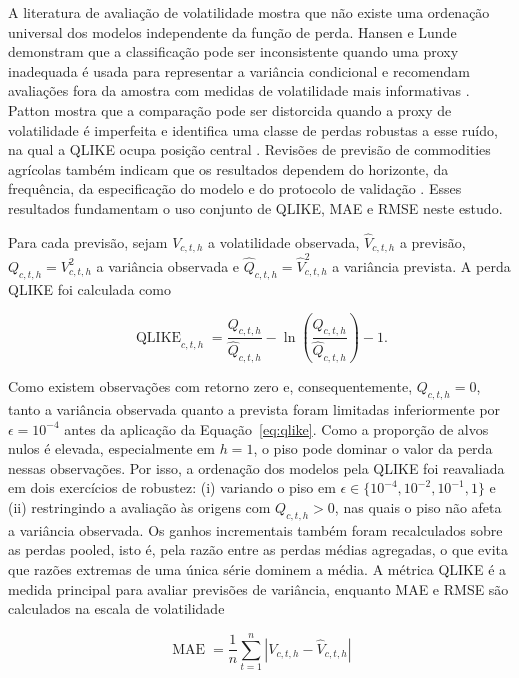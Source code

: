 \documentclass[a4paper,fleqn]{cas-sc}
\begin{document}
A literatura de avaliação de volatilidade mostra que não existe uma ordenação universal dos modelos independente da função de perda. Hansen e Lunde demonstram que a classificação pode ser inconsistente quando uma proxy inadequada é usada para representar a variância condicional e recomendam avaliações fora da amostra com medidas de volatilidade mais informativas \citep{HansenLunde2006ConsistentRanking}. Patton mostra que a comparação pode ser distorcida quando a proxy de volatilidade é imperfeita e identifica uma classe de perdas robustas a esse ruído, na qual a QLIKE ocupa posição central \citep{Patton2011VolatilityProxy}. Revisões de previsão de commodities agrícolas também indicam que os resultados dependem do horizonte, da frequência, da especificação do modelo e do protocolo de validação \citep{Guindani2024AgriculturalForecasting}. Esses resultados fundamentam o uso conjunto de QLIKE, MAE e RMSE neste estudo.

Para cada previsão, sejam \(V_{c,t,h}\) a volatilidade observada, \(\widehat{V}_{c,t,h}\) a previsão, \(Q_{c,t,h}=V_{c,t,h}^{2}\) a variância observada e \(\widehat{Q}_{c,t,h}=\widehat{V}_{c,t,h}^{2}\) a variância prevista. A perda QLIKE foi calculada como

\begin{equation}
\operatorname{QLIKE}_{c,t,h}
=
\frac{Q_{c,t,h}}{\widehat{Q}_{c,t,h}}
-\ln\left(\frac{Q_{c,t,h}}{\widehat{Q}_{c,t,h}}\right)-1.
\label{eq:qlike}
\end{equation}

Como existem observações com retorno zero e, consequentemente, \(Q_{c,t,h}=0\), tanto a variância observada quanto a prevista foram limitadas inferiormente por \(\epsilon=10^{-4}\) antes da aplicação da Equação~\ref{eq:qlike}. Como a proporção de alvos nulos é elevada, especialmente em \(h=1\), o piso pode dominar o valor da perda nessas observações. Por isso, a ordenação dos modelos pela QLIKE foi reavaliada em dois exercícios de robustez: (i) variando o piso em \(\epsilon\in\{10^{-4},10^{-2},10^{-1},1\}\) e (ii) restringindo a avaliação às origens com \(Q_{c,t,h}>0\), nas quais o piso não afeta a variância observada. Os ganhos incrementais também foram recalculados sobre as perdas pooled, isto é, pela razão entre as perdas médias agregadas, o que evita que razões extremas de uma única série dominem a média. A métrica QLIKE é a medida principal para avaliar previsões de variância, enquanto MAE e RMSE são calculados na escala de volatilidade

\begin{equation}
\operatorname{MAE}
=
\frac{1}{n}\sum_{t=1}^{n}
\left\lvert V_{c,t,h}-\widehat{V}_{c,t,h}\right\rvert
\label{eq:mae}
\end{equation}
\end{document}
